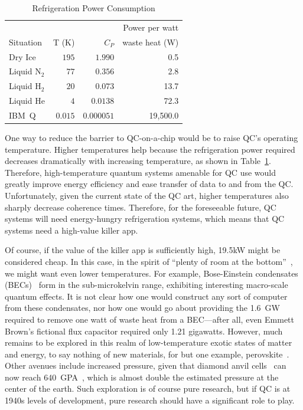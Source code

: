 \begin{table}
\begin{tabular}{l|r|r|r}
	&	&	& Power per watt \\
Situation
	& T (K)
		& $C_P$	& waste heat (W) \\
\hline
\hline
\hline
Dry Ice
	& $195$
		& $1.990$
			& 0.5 \\
\hline
Liquid N$_2$
	& $77$
		& $0.356$
			& 2.8 \\
Liquid H$_2$
	& $20$
		& $0.073$
			& 13.7 \\
\hline
Liquid He
	& $4$
		& $0.0138$
			& 72.3 \\
\hline
IBM~Q	& $0.015$
		& $0.000051$
			& 19,500.0 \\
\end{tabular}
\caption{Refrigeration Power Consumption}
\label{tab:future:Refrigeration Power Consumption}
\end{table}

One way to reduce the barrier to QC-on-a-chip would be to raise
QC's operating temperature.
Higher temperatures help because the refrigeration power required
decreases dramatically with increasing temperature, as shown in
Table~\ref{tab:future:Refrigeration Power Consumption}.
Therefore, high-temperature quantum systems amenable for QC use would
greatly improve energy efficiency and ease transfer of data to and from
the QC.
Unfortunately, given the current state of the QC art, higher
temperatures also sharply decrease coherence times.
Therefore, for the foreseeable future, QC systems will need
energy-hungry refrigeration systems, which means that QC
systems need a high-value killer app.

Of course, if the value of the killer app is sufficiently high,
19.5kW might be considered cheap.
In this case, in the spirit of
``plenty of room at the bottom''~\cite{RichardPFeynman1959RoomAtBottom},
we might want even lower temperatures.
For example, Bose-Einstein condensates
(BECs)~\cite{NIST2001BoseEinsteinCondensate}
form in the sub-microkelvin range, exhibiting interesting
macro-scale quantum effects.
It is not clear how one would construct any sort of computer from
these condensates, nor how one would go about providing the 1.6~GW
required to remove one watt of waste heat from a BEC---after all,
even Emmett Brown's fictional flux capacitor required only 1.21 gigawatts.
However, much remains to be explored in this realm
of low-temperature exotic states of matter and energy, to say
nothing of new materials, for but one example,
perovskite~\cite{ZhengChen2016PerovskiteQDMOFthinFilm}.
Other avenues include increased pressure, given that diamond anvil
cells~\cite{Weir1959DiamondAnvilCell} can now reach
640~GPA~\cite{LeonidDubrovinsky2012640GPaDiamondAnvilCell},
which is almost double the estimated pressure at the center of the earth.
Such exploration is of course pure research, but if QC is at 1940s levels
of development, pure research should have a significant role to play.

